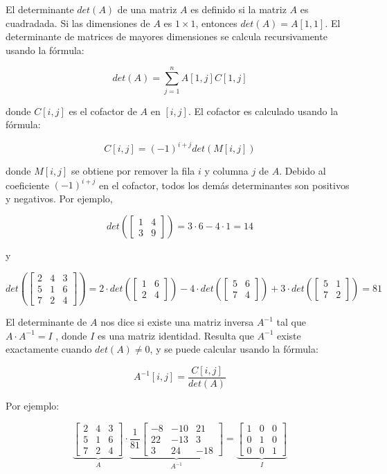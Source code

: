 
El determinante $det(A)$ de una matriz $A$ es definido si la matriz $A$ es cuadradada. Si las dimensiones de $A$ es $1 \times 1$, entonces $det(A) = A[1,1]$. El determinante de matrices de mayores dimensiones se calcula recursivamente usando la fórmula:

$$ det(A)=\sum_{j=1}^{n}A[1,j]C[1,j]$$

donde $C[i,j]$ es el cofactor de $A$ en $[i,j]$. El cofactor es calculado usando la fórmula:

$$C[i,j] = (-1)^{i+j}det(M[i,j])$$



donde $M[i,j]$ se obtiene por remover la fila $i$ y columna $j$ de $A$.  Debido al coeficiente $( -1)^{i+j}$ en el cofactor, todos los demás determinantes son positivos y negativos. Por ejemplo,

$$ det(\begin{bmatrix}
	1 & 4 \\
	3 & 9 
\end{bmatrix})=3 \cdot 6 - 4 \cdot 1 =14$$

y

$$ det(\begin{bmatrix}
	2 & 4 &3 \\
	5 & 1 & 6\\
	7 & 2 & 4
\end{bmatrix})=2 \cdot det(\begin{bmatrix}
1 & 6  \\
2 & 4 \end{bmatrix}) - 4 \cdot det(\begin{bmatrix}
5 & 6  \\
7 & 4 \end{bmatrix}) + 3 \cdot det(\begin{bmatrix}
5 & 1  \\
7 & 2 \end{bmatrix})  =81$$

El determinante de $A$ nos dice si existe una matriz inversa $A^{-1}$ tal que $A \cdot A^{-1} = I$ , donde $I$ es una matriz identidad. Resulta que $A^{-1}$ existe exactamente
cuando $det(A) \neq  0$, y se puede calcular usando la fórmula:

$$ A^{-1}[i,j] = \frac{C[i,j]}{det(A)}  $$

Por ejemplo:

$$ \underset{A}{\underbrace{\begin{bmatrix} 2 & 4 &3 \\ 5 & 1 & 6\\ 7 & 2 & 4 \end{bmatrix}}}
\cdot \underset{A^{-1}}{\underbrace{\frac{1}{81}\begin{bmatrix} -8 & -10 &21 \\ 22 & -13 & 3\\ 3 & 24 & -18 \end{bmatrix}}} = \underset{I}{\underbrace{\begin{bmatrix} 1 & 0 &0 \\ 0 & 1 & 0\\ 0 & 0 & 1 \end{bmatrix}}}$$
